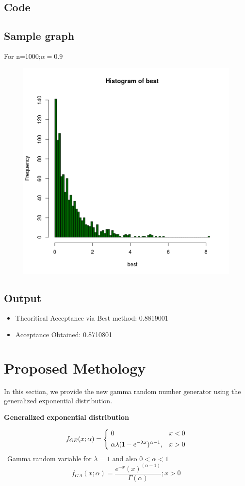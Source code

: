 \documentclass[11pt]{article}
\begin{document}
\subsection{Code}

\subsection{Sample graph}
For n=1000;$\alpha=0.9$
\begin{figure}[H]
\centering
\includegraphics[scale=.65]{image2}
\end{figure}
\subsection{Output}
\begin{itemize}
\item Theoritical Acceptance via Best method: 0.8819001 
\item Acceptance Obtained: 0.8710801
\end{itemize}
\section{Proposed Methology}
In this section, we provide the new gamma random number generator using the generalized exponential distribution.
\begin{flushleft}
\textbf{Generalized exponential distribution}
\end{flushleft}
\[
f_{GE}(x;\alpha)=
\begin{dcases}
\ 0 & x<0 \\
\ \alpha\lambda(1-e^{-\lambda x})^{\alpha-1}, & x>0
\end{dcases}
\]
\ Gamma random variable for $\lambda=1$ and also $0<\alpha<1$\\
$$f_{GA}(x;\alpha)=
\frac{e^{- x}( x)^{(\alpha-1)}}{\Gamma(\alpha)};x>0$$ \\
\end{document}
